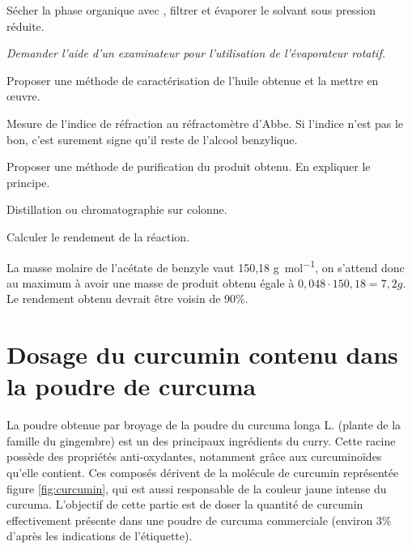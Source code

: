 \documentclass[twoside,a4paper,11pt,answers]{exam}
\begin{document}
\begin{questions}
Sécher la phase organique avec , filtrer et évaporer le solvant sous pression réduite. 
\par \textit{Demander l’aide d'un examinateur pour l’utilisation de l’évaporateur rotatif.}

\begin{framed}
    \question Proposer une méthode de caractérisation de l’huile obtenue et la mettre en œuvre. 
\begin{solution}[2cm]
     Mesure de l'indice de réfraction au réfractomètre d'Abbe. Si l'indice n'est pas le bon, c'est surement signe qu'il reste de l'alcool benzylique.
\end{solution}
\end{framed}

\begin{framed}
    \question Proposer une méthode de purification du produit obtenu. En expliquer le principe.
\begin{solution}[3cm]
     Distillation ou chromatographie sur colonne.
\end{solution}
\end{framed}

\begin{framed}
    \question Calculer le rendement de la réaction.
\begin{solution}[3cm]
     La masse molaire de l'acétate de benzyle vaut 150,18 \si{\gram\per\mol}, on s'attend donc au maximum à avoir une masse de produit obtenu égale à $ 0,048 \cdot 150,18 = 7,2 g$. Le rendement obtenu devrait être voisin de 90\%.
\end{solution}
\end{framed}


\end{questions}

\newpage

\section{Dosage du curcumin contenu dans la poudre de curcuma}

La poudre obtenue par broyage de la poudre du curcuma longa L. (plante de la famille du gingembre) est un des principaux ingrédients du curry. Cette racine possède des propriétés anti-oxydantes, notamment grâce aux curcuminoïdes qu'elle contient. Ces composés dérivent de la molécule de curcumin représentée figure \ref{fig:curcumin}, qui est aussi responsable de la couleur jaune intense du curcuma. L'objectif de cette partie est de doser la quantité de curcumin effectivement présente dans une poudre de curcuma commerciale (environ 3\% d'après les indications de l'étiquette).
\end{document}
